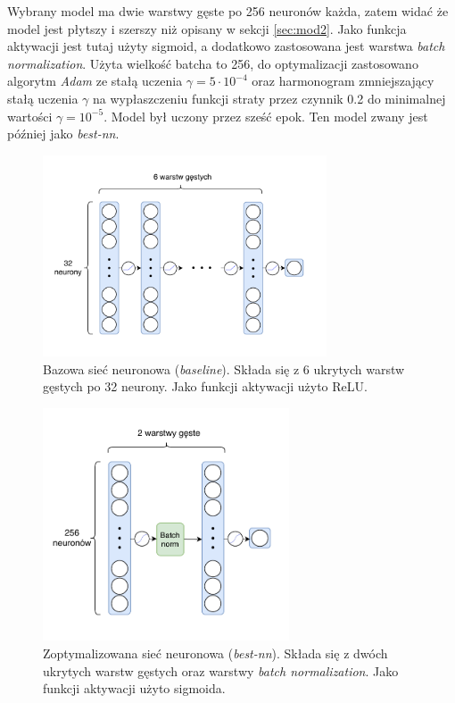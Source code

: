 \documentclass{pracalicmgr}
\begin{document}
	Wybrany model ma dwie warstwy gęste po 256 neuronów każda, zatem widać że model jest płytszy i szerszy niż opisany w sekcji \ref{sec:mod2}. Jako funkcja aktywacji jest tutaj użyty sigmoid, a dodatkowo zastosowana jest warstwa \textit{batch normalization}. Użyta wielkość batcha to 256, do optymalizacji  zastosowano algorytm \textit{Adam} ze stałą uczenia $\gamma = 5\cdot 10^{-4}$ oraz harmonogram zmniejszający stałą uczenia $\gamma$ na wypłaszczeniu funkcji straty przez czynnik 0.2 do minimalnej wartości $\gamma = 10^{-5}$. Model był uczony przez sześć epok. Ten model zwany jest później jako \textit{best-nn}.

	\begin{figure}[H]
	\centering
	\includegraphics[width=0.75\textwidth]{neural_net.pdf}
	\caption{Bazowa sieć neuronowa (\textit{baseline}). Składa się z 6 ukrytych warstw gęstych po 32 neurony. Jako funkcji aktywacji użyto ReLU.}
	\label{fig:nn1}
	\end{figure}
	
	\begin{figure}[H]
	\centering
	\includegraphics[width=0.65\textwidth]{best_neural_net.pdf}
	\caption{Zoptymalizowana sieć neuronowa (\textit{best-nn}). Składa się z dwóch ukrytych warstw gęstych oraz warstwy \textit{batch normalization}. Jako funkcji aktywacji użyto sigmoida.}
	\label{fig:nn2}
	\end{figure}
\end{document}
